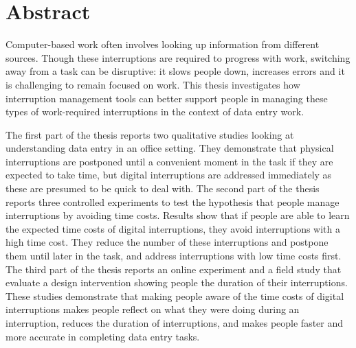 \section*{Abstract}
Computer-based work often involves looking up information from different sources. Though these interruptions are required to progress with work, switching away from a task can be disruptive: it slows people down, increases errors and it is challenging to remain focused on work. This thesis investigates how interruption management tools can better support people in managing these types of work-required interruptions in the context of data entry work.

The first part of the thesis reports two qualitative studies looking at understanding data entry in an office setting. They demonstrate that physical interruptions are postponed until a convenient moment in the task if they are expected to take time, but digital interruptions are addressed immediately as these are presumed to be quick to deal with. The second part of the thesis reports three controlled experiments to test the hypothesis that people manage interruptions by avoiding time costs. Results show that if people are able to learn the expected time costs of digital interruptions, they avoid interruptions with a high time cost. They reduce the number of these interruptions and postpone them until later in the task, and address interruptions with low time costs first. The third part of the thesis reports an online experiment and a field study that evaluate a design intervention showing people the duration of their interruptions. These studies demonstrate that making people aware of the time costs of digital interruptions makes people reflect on what they were doing during an interruption, reduces the duration of interruptions, and makes people faster and more accurate in completing data entry tasks.

